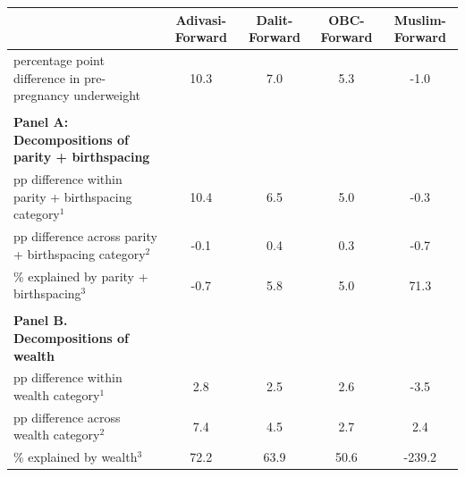 \begin{tabular}{l*{4}{c}}
\toprule
            &\multicolumn{1}{c}{Adivasi-Forward}&\multicolumn{1}{c}{Dalit-Forward}&\multicolumn{1}{c}{OBC-Forward}&\multicolumn{1}{c}{Muslim-Forward}\\
\midrule
\midrule
percentage point difference in pre-pregnancy underweight&        10.3&         7.0&         5.3&        -1.0\\
            &            &            &            &            \\
\textbf{Panel A: Decompositions of parity + birthspacing}&            &            &            &            \\
pp difference within parity + birthspacing category$^{1}$&        10.4&         6.5&         5.0&        -0.3\\
pp difference across parity + birthspacing category$^{2}$&        -0.1&         0.4&         0.3&        -0.7\\
\% explained by parity + birthspacing$^{3}$&        -0.7&         5.8&         5.0&        71.3\\
            &            &            &            &            \\
\textbf{Panel B. Decompositions of wealth}&            &            &            &            \\
pp difference within wealth category$^{1}$&         2.8&         2.5&         2.6&        -3.5\\
pp difference across wealth category$^{2}$&         7.4&         4.5&         2.7&         2.4\\
\% explained by wealth$^{3}$&        72.2&        63.9&        50.6&      -239.2\\
\bottomrule
\end{tabular}
